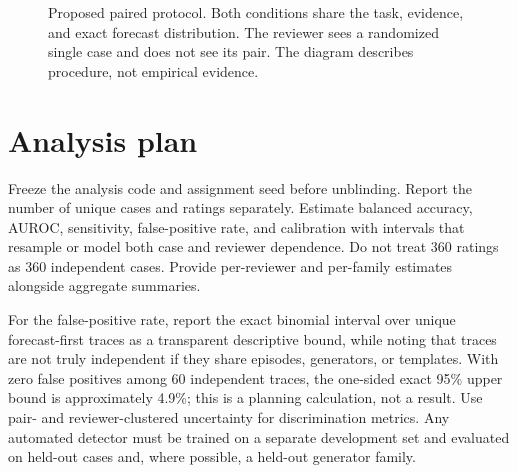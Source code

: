 \documentclass[10pt]{article}
\begin{document}
\begin{figure}[t]
\centering
{}
\caption{Proposed paired protocol. Both conditions share the task, evidence, and exact forecast distribution. The reviewer sees a randomized single case and does not see its pair. The diagram describes procedure, not empirical evidence.}
\label{fig:design}
\end{figure}

\section{Analysis plan}
Freeze the analysis code and assignment seed before unblinding. Report the number of unique cases and ratings separately. Estimate balanced accuracy, AUROC, sensitivity, false-positive rate, and calibration with intervals that resample or model both case and reviewer dependence. Do not treat 360 ratings as 360 independent cases. Provide per-reviewer and per-family estimates alongside aggregate summaries.

For the false-positive rate, report the exact binomial interval over unique forecast-first traces as a transparent descriptive bound, while noting that traces are not truly independent if they share episodes, generators, or templates. With zero false positives among 60 independent traces, the one-sided exact 95\% upper bound is approximately 4.9\%; this is a planning calculation, not a result. Use pair- and reviewer-clustered uncertainty for discrimination metrics. Any automated detector must be trained on a separate development set and evaluated on held-out cases and, where possible, a held-out generator family.
\end{document}

